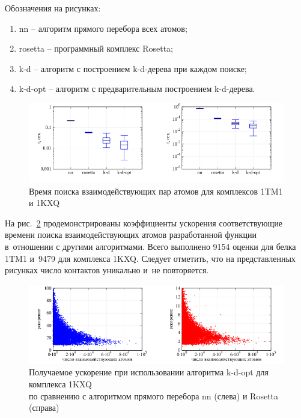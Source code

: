 Обозначения на рисунках:
\vspace{-10pt}
\begin{enumerate}
	\setlength{\itemsep}{0pt}
	\setlength{\parskip}{0pt}	
	\item nn -- алгоритм прямого перебора всех атомов;
	\item rosetta -- программный комплекс Rosetta;
	\item k-d -- алгоритм с построением k-d-дерева при каждом поиске;
	\item k-d-opt -- алгоритм с предварительным построением k-d-дерева.
\end{enumerate}


\begin{figure}[h!]
	\captionsetup{justification=centering}
	\centering
	\includegraphics[width=1.0\linewidth]{images/bxpt.pdf}
	\caption{Время поиска взаимодействующих пар атомов для комплексов 1TM1 и 1KXQ}
	\label{belki}
\end{figure}

На рис.~\ref{acell} продемонстрированы коэффициенты ускорения соответствующие времени поиска взаимодействующих атомов разработанной функции в~отношении с другими алгоритмами. Всего выполнено 9154 оценки для белка 1TM1 и~9479 для комплекса 1KXQ. Следует отметить, что на представленных рисунках число контактов уникально и~не повторяется.

\begin{figure}[h!]
	\captionsetup{justification=centering}
	\centering
	\includegraphics[width=1.0\linewidth]{images/accel.pdf}
	\caption{Получаемое ускорение при использовании алгоритма k-d-opt для комплекса 1KXQ \\ по сравнению с алгоритмом прямого перебора nn (слева) и Rosetta (справа)}
	\label{acell}
\end{figure}



